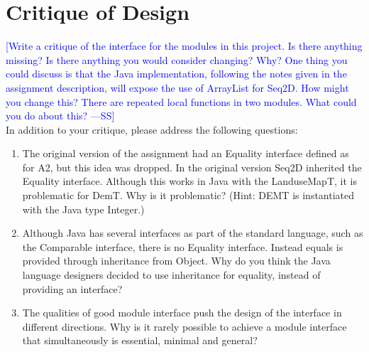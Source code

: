 \documentclass[12pt]{article}
\newcommand{\authornote}[3]{\textcolor{#1}{[#3 ---#2]}}
\newcommand{\authornote}[3]{}
\newcommand{\wss}[1]{\authornote{blue}{SS}{#1}}
\begin{document}
\newpage

\section*{Critique of Design}

\wss{Write a critique of the interface for the modules in this project.  Is there
anything missing?  Is there anything you would consider changing?  Why?  One
thing you could discuss is that the Java implementation, following the notes
given in the assignment description, will expose the use of ArrayList for Seq2D.
 How might you change this?  There are repeated local functions in two modules.
What could you do about this?}\\

In addition to your critique, please address the following questions:

\begin{enumerate}
\item The original version of the assignment had an Equality interface defined
  as for A2, but this idea was dropped.  In the original version Seq2D inherited
  the Equality interface.  Although this works in Java with the LanduseMapT, it is
  problematic for DemT.  Why is it problematic?  (Hint: DEMT is instantiated
  with the Java type Integer.)
\item Although Java has several interfaces as part of the standard language,
  such as the Comparable interface, there is no Equality interface.  Instead
  equals is provided through inheritance from Object.  Why do you think the
  Java language designers decided to use inheritance for equality, instead of
  providing an interface?
\item The qualities of good module interface push the design of the interface in
  different directions. Why is it rarely possible to achieve a module interface
  that simultaneously is essential, minimal and general?
\end{enumerate}
\end{document}
